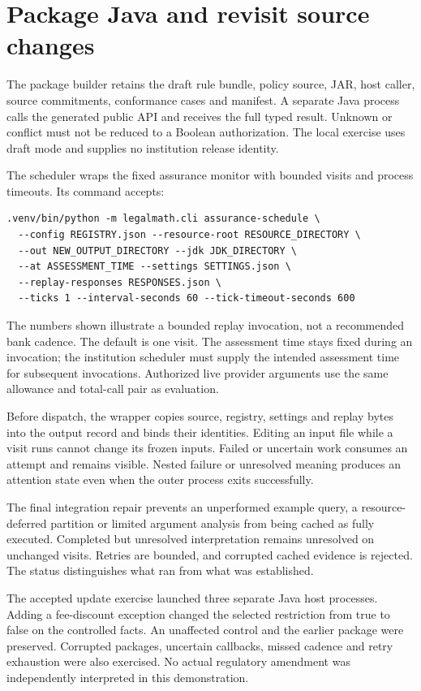 \documentclass[12pt,a4paper,oneside,openany]{book}
\begin{document}
\section{Package Java and revisit source changes}

The package builder retains the draft rule bundle, policy source, JAR, host
caller, source commitments, conformance cases and manifest. A separate Java
process calls the generated public API and receives the full typed result.
Unknown or conflict must not be reduced to a Boolean authorization. The local
exercise uses draft mode and supplies no institution release identity.

The scheduler wraps the fixed assurance monitor with bounded visits and process
timeouts. Its command accepts:
\begin{lstlisting}
.venv/bin/python -m legalmath.cli assurance-schedule \
  --config REGISTRY.json --resource-root RESOURCE_DIRECTORY \
  --out NEW_OUTPUT_DIRECTORY --jdk JDK_DIRECTORY \
  --at ASSESSMENT_TIME --settings SETTINGS.json \
  --replay-responses RESPONSES.json \
  --ticks 1 --interval-seconds 60 --tick-timeout-seconds 600
\end{lstlisting}
The numbers shown illustrate a bounded replay invocation, not a recommended
bank cadence. The default is one visit. The assessment time stays fixed during
an invocation; the institution scheduler must supply the intended assessment
time for subsequent invocations. Authorized live provider arguments use the
same allowance and total-call pair as evaluation.

Before dispatch, the wrapper copies source, registry, settings and replay bytes
into the output record and binds their identities. Editing an input file while
a visit runs cannot change its frozen inputs. Failed or uncertain work consumes
an attempt and remains visible. Nested failure or unresolved meaning produces
an attention state even when the outer process exits successfully.

The final integration repair prevents an unperformed example query, a
resource-deferred partition or limited argument analysis from being cached as
fully executed. Completed but unresolved interpretation remains unresolved on
unchanged visits. Retries are bounded, and corrupted cached evidence is rejected.
The status distinguishes what ran from what was established.

The accepted update exercise launched three separate Java host processes.
Adding a fee-discount exception changed the selected restriction from true to
false on the controlled facts. An unaffected control and the earlier package
were preserved. Corrupted packages, uncertain callbacks, missed cadence and
retry exhaustion were also exercised. No actual regulatory amendment was
independently interpreted in this demonstration.
\end{document}
